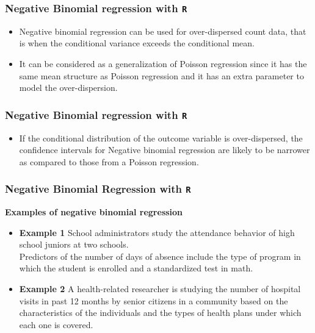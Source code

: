 \documentclass[MASTER.tex]{subfiles}
\begin{document}
\begin{frame}[fragile]
	\frametitle{Negative Binomial regression with \texttt{R}}
	\Large	
	\begin{itemize}
		\item Negative binomial regression can be used for over-dispersed count data, that is when the conditional 
		variance exceeds the conditional mean. 
		\item It can be considered as a generalization of Poisson regression since it has the same mean structure as Poisson 	
		regression and it has an extra parameter to model the over-dispersion. 
	\end{itemize}
\end{frame}
\begin{frame}[fragile]
	\frametitle{Negative Binomial regression with \texttt{R}}
	\Large	
\begin{itemize}
		\item If the conditional distribution of the outcome variable is over-dispersed, the confidence intervals for Negative binomial regression are likely to be narrower as compared to those from a Poisson regression.
	\end{itemize}
\end{frame}
\begin{frame}[fragile]
	\frametitle{Negative Binomial Regression with \texttt{R} }
	\Large
	
\textbf{Examples of negative binomial regression}
\begin{itemize}
\item \textbf{Example 1}  School administrators study the attendance behavior of high school juniors at two schools. \\ Predictors of the number of days of absence include the type of program in which the student is enrolled and a standardized test in math.

\item \textbf{Example 2}  A health-related researcher is studying the number of hospital visits in past 12 months by senior citizens in a community based on the characteristics of the individuals and the types of health plans under which each one is covered.
\end{itemize}
\end{frame}
\end{document}
